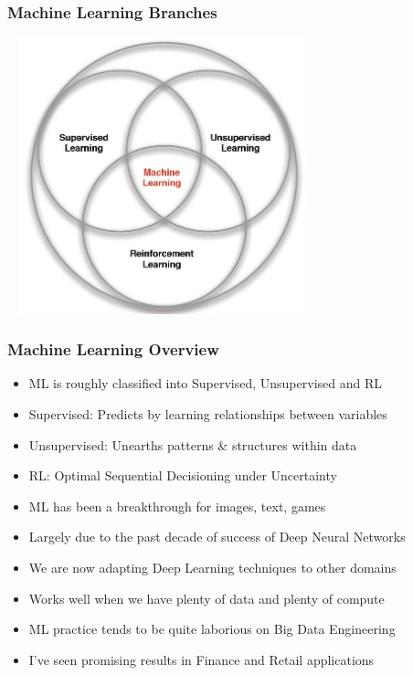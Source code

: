 \documentclass[handout]{beamer}
\begin{document}
\begin{frame}
\frametitle{Machine Learning Branches}
\includegraphics[width=9cm, height=8cm]{../finance/cme241/MLBranches.PNG}
\end{frame}

\begin{frame}
\frametitle{Machine Learning Overview}
\pause
\begin{itemize}[<+->]
\item ML is roughly classified into Supervised, Unsupervised and RL
\item Supervised: Predicts by learning relationships between variables
\item Unsupervised: Unearths patterns \& structures within data
\item RL: Optimal Sequential Decisioning under Uncertainty
\item ML has been a breakthrough for images, text, games
\item Largely due to the past decade of success of Deep Neural Networks
\item We are now adapting Deep Learning techniques to other domains
\item Works well when we have plenty of data and plenty of compute
\item ML practice tends to be quite laborious on Big Data Engineering
\item I've seen promising results in Finance and Retail applications
\end{itemize}
\end{frame}
\end{document}
